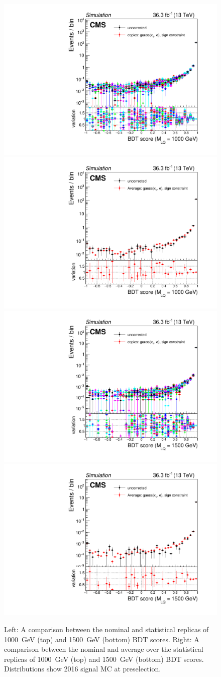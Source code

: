 \begin{figure}[H]
    \centering
    {\includegraphics[width=.49\textwidth]{Images/Analysis/GEScaleSystStudy/StudyPlots_2016/SignalM1000/Copies/preSel/GEScaleSystStudyPlot_2016_SignalM1000_Copies_preSel_LQToBMu_pair_uubj_BDT_discrim_M1000.pdf}}
    {\includegraphics[width=.49\textwidth]{Images/Analysis/GEScaleSystStudy/StudyPlots_2016/SignalM1000/Averages/preSel/GEScaleSystStudyPlot_2016_SignalM1000_Average_preSel_LQToBMu_pair_uubj_BDT_discrim_M1000.pdf}}
    {\includegraphics[width=.49\textwidth]{Images/Analysis/GEScaleSystStudy/StudyPlots_2016/SignalM1500/Copies/preSel/GEScaleSystStudyPlot_2016_SignalM1500_Copies_preSel_LQToBMu_pair_uubj_BDT_discrim_M1500.pdf}}
    {\includegraphics[width=.49\textwidth]{Images/Analysis/GEScaleSystStudy/StudyPlots_2016/SignalM1500/Averages/preSel/GEScaleSystStudyPlot_2016_SignalM1500_Average_preSel_LQToBMu_pair_uubj_BDT_discrim_M1500.pdf}}
    \caption{Left: A comparison between the nominal and statistical replicas of \SI{1000}{GeV} (top) and \SI{1500}{GeV} (bottom) BDT scores. Right: A comparison between the nominal and average over the statistical replicas of \SI{1000}{GeV} (top) and \SI{1500}{GeV} (bottom) BDT scores. Distributions show 2016 signal MC at preselection.}
    \label{figapp:gesysBDTscoresSig1}
\end{figure}

